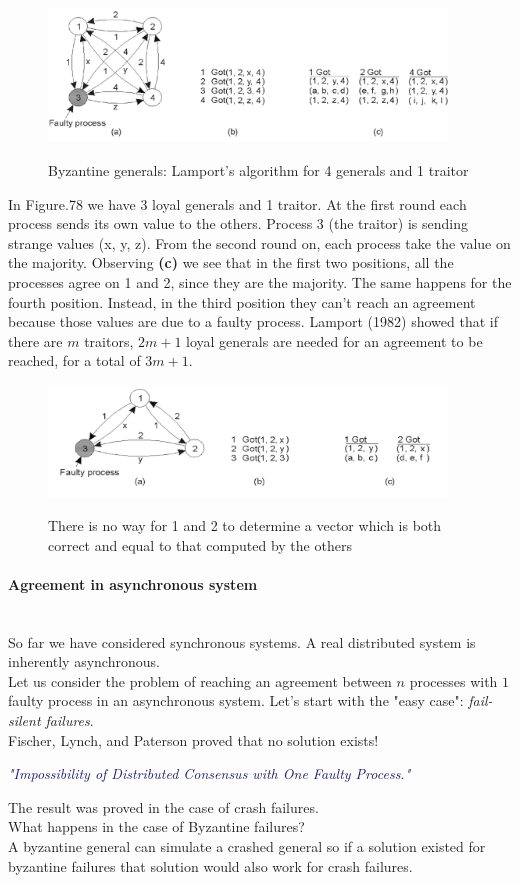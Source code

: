 \documentclass[10pt,a4paper]{article}
\newcommand{\myparagraph}[1]{\paragraph{#1}\mbox{}\\[0.05in]}
\begin{document}
\begin{figure}[h!]
\hfill \includegraphics[width=300pt]{images/byzantine-generals.png}\hspace*{\fill}
  \label{fig:byzantine-generals}
  \caption{Byzantine generals: Lamport's algorithm for 4 generals and 1 traitor}
\end{figure}
In Figure.78 we have 3 loyal generals and 1 traitor. At the first round each process sends its own value to the others. Process 3 (the traitor) is sending strange values (x, y, z). From the second round on, each process take the value on the majority. Observing \textbf{(c)} we see that in the first two positions, all the processes agree on 1 and 2, since they are the majority. The same happens for the fourth position. Instead, in the third position they can't reach an agreement because those values are due to a faulty process. 
Lamport (1982) showed that if there are $m$ traitors, $2m+1$ loyal generals are needed for an agreement to be reached, for a total of $3m+1$.
\begin{figure}[h!]
\hfill \includegraphics[width=300pt]{images/byzantine-generals2.png}\hspace*{\fill}
  \label{fig:byzantine-generals2}
  \caption{There is no way for 1 and 2 to determine a vector which is both correct and equal to that computed by the others}
\end{figure} \pagebreak
\myparagraph{Agreement in asynchronous system}
So far we have considered synchronous systems. A real distributed system is inherently asynchronous.\\ Let us consider the problem of reaching an agreement between $n$ processes with $1$ faulty process in an asynchronous system. Let's start with the "easy case": \textit{fail-silent failures}. \\
Fischer, Lynch, and Paterson proved that no solution exists!
\begin{center}
\textcolor{MidnightBlue}{\textit{"Impossibility of Distributed Consensus with One Faulty Process."}}
\end{center}
The result was proved in the case of crash failures.\\ What happens in the case of Byzantine failures? \\
A byzantine general can simulate a crashed general so if a solution existed for byzantine failures that solution would also work for crash failures.
\end{document}
